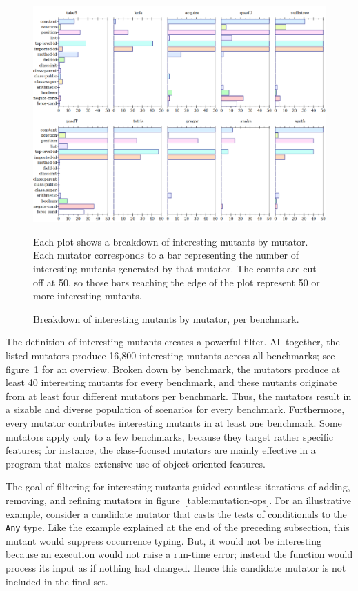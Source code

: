 \begin{figure}
 \centering
 \includegraphics[scale=0.33]{./plots/mutant-breakdown}

 \vspace{1em}

 \begin{minipage}{\textwidth}
 Each plot shows a breakdown of interesting mutants by mutator.
 Each mutator corresponds to a bar representing the number of interesting mutants generated by that mutator.
 The counts are cut off at 50, so those bars reaching the edge of the plot represent 50 or more interesting mutants.
 \end{minipage}

\caption{Breakdown of interesting mutants by mutator, per benchmark.}
 \label{fig:mutant-breakdown}
\end{figure}

The definition of interesting mutants creates a powerful filter. All
together, the listed mutators produce 16,800 interesting mutants across all benchmarks; see
figure~\ref{fig:mutant-breakdown} for an overview. Broken down by benchmark, the
mutators produce at least 40 interesting mutants for every benchmark, and
these mutants originate from at least four different mutators per benchmark.
Thus, the mutators result in a sizable and diverse population of scenarios for
every benchmark.  Furthermore, every mutator contributes interesting mutants in at least
one benchmark.  Some mutators apply only to a few benchmarks, because they
target rather specific features; for instance, the class-focused mutators are
mainly effective in a program that makes extensive use of object-oriented
features.

The goal of filtering for interesting mutants guided countless iterations of
adding, removing, and refining mutators in figure~\ref{table:mutation-ops}.  For
an illustrative example, consider a candidate mutator that casts the tests of
conditionals to the {\tt Any} type. Like the example explained at the end of the
preceding subsection, this mutant would suppress occurrence typing. But, it
would not be interesting because an execution would not raise a run-time error;
instead the function would process its input as if nothing had changed. Hence
this candidate mutator is not included in the final set.

